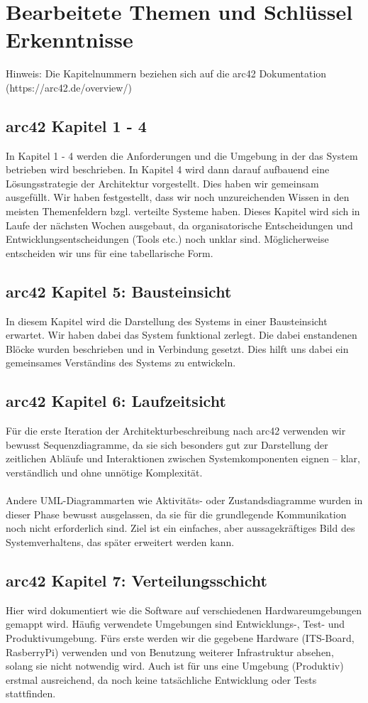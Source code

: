 \documentclass{article}
\begin{document}
\section{Bearbeitete Themen und Schlüssel Erkenntnisse}
Hinweis: Die Kapitelnummern beziehen sich auf die arc42 Dokumentation (https://arc42.de/overview/)

\subsection{arc42 Kapitel 1 - 4}
In Kapitel 1 - 4 werden die Anforderungen und die Umgebung in der das System betrieben wird beschrieben. In Kapitel 4 wird dann darauf aufbauend eine Lösungsstrategie der Architektur vorgestellt. Dies haben wir gemeinsam ausgefüllt. Wir haben festgestellt, dass wir noch unzureichenden Wissen in den meisten Themenfeldern bzgl. verteilte Systeme haben. Dieses Kapitel wird sich in Laufe der nächsten Wochen ausgebaut, da organisatorische Entscheidungen und Entwicklungsentscheidungen (Tools etc.) noch unklar sind. Möglicherweise entscheiden wir uns für eine tabellarische Form.

\subsection{arc42 Kapitel 5: Bausteinsicht}
In diesem Kapitel wird die Darstellung des Systems in einer Bausteinsicht erwartet. Wir haben dabei das System funktional zerlegt. Die dabei enstandenen Blöcke wurden beschrieben und in Verbindung gesetzt. Dies hilft uns dabei ein gemeinsames Verständins des Systems zu entwickeln. 

\subsection{arc42 Kapitel 6: Laufzeitsicht}
Für die erste Iteration der Architekturbeschreibung nach arc42 verwenden wir bewusst Sequenzdiagramme, da sie sich besonders gut zur Darstellung der zeitlichen Abläufe und Interaktionen zwischen Systemkomponenten eignen – klar, verständlich und ohne unnötige Komplexität.\\\\
Andere UML-Diagrammarten wie Aktivitäts- oder Zustandsdiagramme wurden in dieser Phase bewusst ausgelassen, da sie für die grundlegende Kommunikation noch nicht erforderlich sind. Ziel ist ein einfaches, aber aussagekräftiges Bild des Systemverhaltens, das später erweitert werden kann.

\subsection{arc42 Kapitel 7: Verteilungsschicht}
Hier wird dokumentiert wie die Software auf verschiedenen Hardwareumgebungen gemappt wird. 
Häufig verwendete Umgebungen sind Entwicklungs-, Test- und Produktivumgebung.
Fürs erste werden wir die gegebene Hardware (ITS-Board, RasberryPi) verwenden und von Benutzung weiterer Infrastruktur absehen, solang sie nicht notwendig wird.
Auch ist für uns eine Umgebung (Produktiv) erstmal ausreichend, da noch keine tatsächliche Entwicklung oder Tests stattfinden.
\end{document}
